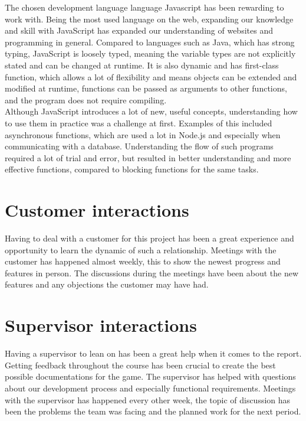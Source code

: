 The chosen development language language Javascript has been rewarding to work with. Being the most used language on the web, expanding our knowledge and skill with JavaScript has expanded our understanding of websites and programming in general. Compared to languages such as Java, which has strong typing, JavaScript is loosely typed, meaning the variable types are not explicitly stated and can be changed at runtime. It is also dynamic and has first-class function, which allows a lot of flexibility and means objects can be extended and modified at runtime, functions can be passed as arguments to other functions, and the program does not require compiling.\\
\newline
Although JavaScript introduces a lot of new, useful concepts, understanding how to use them in practice was a challenge at first. Examples of this included asynchronous functions, which are used a lot in Node.js and especially when communicating with a database. Understanding the flow of such programs required a lot of trial and error, but resulted in better understanding and more effective functions, compared to blocking functions for the same tasks.\\


\section{Customer interactions}

Having to deal with a customer for this project has been a great experience and opportunity to learn the dynamic of such a relationship. Meetings with the customer has happened almost weekly, this to show the newest progress and features in person. The discussions during the meetings have been about the new features and any objections the customer may have had. 

\section{Supervisor interactions}
Having a supervisor to lean on has been a great help when it comes to the report. Getting feedback throughout the course has been crucial to create the best possible documentations for the game. The supervisor has helped with questions about our development process and especially functional requirements. Meetings with the supervisor has happened every other week, the topic of discussion has been the problems the team was facing and the planned work for the next period. 

